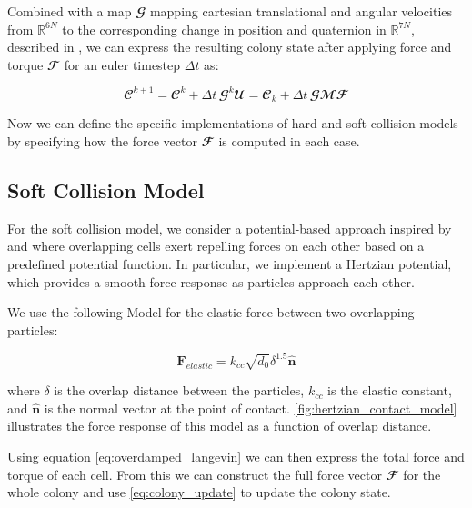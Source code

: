 \documentclass[conference]{IEEEtran}
\begin{document}
Combined with a map $\mathbfcal{G}$ mapping cartesian translational and angular velocities from $\mathbb{R}^{6N}$ to the corresponding change in position and quaternion in $\mathbb{R}^{7N}$, described in \cite{Weady2024}, we can express the resulting colony state after applying force and torque $\mathbfcal{F}$ for an euler timestep $\Delta t$ as:

\begin{equation}
    \mathbfcal{C}^{k+1}  = \mathbfcal{C}^k + \Delta t \, \mathbfcal{G}^k\mathbfcal{U} = \mathbfcal{C}_k + \Delta t \, \mathbfcal{G}\mathbfcal{M} \mathbfcal{F}
\end{equation}
\label{eq:colony_update}



Now we can define the specific implementations of hard and soft collision models by specifying how the force vector $\mathbfcal{F}$ is computed in each case.

\newpage

\subsection{Soft Collision Model}

For the soft collision model, we consider a potential-based approach inspired by \cite{Warren2019} and \cite{You2018} where overlapping cells exert repelling forces on each other based on a predefined potential function. In particular, we implement a Hertzian potential, which provides a smooth force response as particles approach each other.

We use the following Model for the elastic force between two overlapping particles:

\begin{equation}
    \mathbf{F}_{elastic} =k_{cc} \sqrt{d_0} \delta^{1.5} \hat{\mathbf{n}}
\end{equation}
\label{eq:hertzian_contact_model}

where $\delta$ is the overlap distance between the particles, $k_{cc}$ is the elastic constant, and $\hat{\mathbf{n}}$ is the normal vector at the point of contact. \autoref{fig:hertzian_contact_model} illustrates the force response of this model as a function of overlap distance.

Using equation \autoref{eq:overdamped_langevin} we can then express the total force and torque of each cell. From this we can construct the full force vector $\mathbfcal{F}$ for the whole colony and use \autoref{eq:colony_update} to update the colony state.
\end{document}
